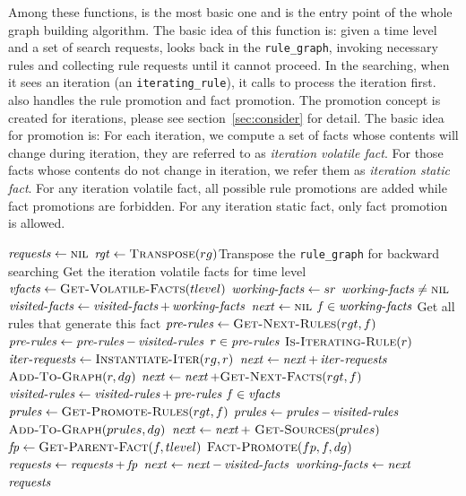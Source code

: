 \documentclass{article}
\begin{document}
Among these functions,  is the most basic one and
is the entry point of the whole graph building algorithm. The basic
idea of this function is: given a time level and a set of search
requests,  looks back in the \texttt{rule\_graph},
invoking necessary rules and collecting rule requests until it cannot
proceed. In the searching, when it sees an iteration (an
\texttt{iterating\_rule}), it calls
 to process the iteration
first.  also handles the rule promotion and
fact promotion. The promotion concept is created for
iterations, please see section~\ref{sec:consider} for detail. The
basic idea for promotion is: For each iteration, we compute a set of
facts whose contents will change during iteration, they are referred
to as {\it iteration volatile fact}. For those facts whose contents do
not change in iteration, we refer them as 
{\it iteration static fact}. For any iteration volatile fact, all
possible rule promotions are added while fact promotions are
forbidden. For any iteration static fact, only fact promotion is
allowed. 

\begin{codebox}
\li $\id{requests} \gets \const{nil}$
\li $\id{rgt} \gets \proc{Transpose}(rg)$\>\>\>\>\>\>\Comment Transpose
the \texttt{rule\_graph} for backward searching
\li \Comment Get the iteration volatile facts for time level 
\li $\id{vfacts} \gets \proc{Get-Volatile-Facts}(tlevel)$
\li $\id{working-facts} \gets sr$
\li \While $\id{working-facts} \ne \const{nil}$
\li   \Do
         $\id{visited-facts} \gets \id{visited-facts} + \id{working-facts}$
\li      $\id{next} \gets \const{nil}$
\li      \For $\id{f} \in \id{working-facts}$
\li        \>\Comment Get all rules that generate this fact
\li        \Do
              $\id{pre-rules} \gets \proc{Get-Next-Rules}(rgt,f)$
\li           $\id{pre-rules} \gets \id{pre-rules} - \id{visited-rules}$
\li           \For $\id{r} \in \id{pre-rules}$ 
\li             \Do
                 \If $\textnormal{\scshape Is-Iterating-Rule}(r)$
\li                 \Then
                   $\id{iter-requests} \gets \proc{Instantiate-Iter}(rg,r)$
\li                $\id{next} \gets \id{next} + \id{iter-requests}$
\li                 \Else
                   $\textnormal{\scshape Add-To-Graph}(r,dg)$
\li                $\id{next} \gets \id{next} + \proc{Get-Next-Facts}(rgt,f)$
                 \End
              \End
\li           $\id{visited-rules} \gets \id{visited-rules} + \id{pre-rules}$
\li           \If $\id{f} \in \id{vfacts}$
\li              \Then $\id{prules} \gets \proc{Get-Promote-Rules}(rgt,f)$
\li                    $\id{prules} \gets \id{prules} - \id{visited-rules}$
\li                    $\textnormal{\scshape Add-To-Graph}(prules,dg)$
\li               $\id{next} \gets \id{next} +~\proc{Get-Sources}(prules)$
\li              \Else $\id{fp} \gets \proc{Get-Parent-Fact}(f,tlevel)$
\li                    $\textnormal{\scshape Fact-Promote}(fp,f,dg)$
\li                    $\id{requests} \gets \id{requests} + \id{fp}$
              \End
         \End
\li      $\id{next} \gets \id{next} - \id{visited-facts}$
\li      $\id{working-facts} \gets \id{next}$
    \End
\li \Return $\id{requests}$
\end{codebox}
\end{document}
